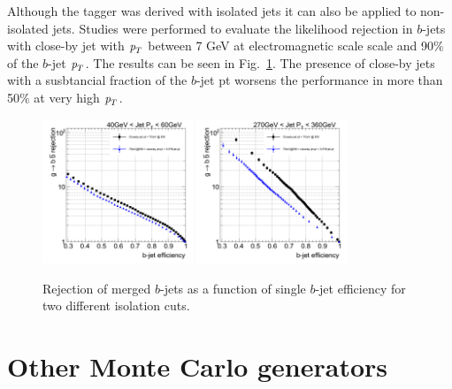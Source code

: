 Although the tagger was derived with isolated jets it can also be applied to non-isolated jets. Studies were performed to evaluate the likelihood rejection in $b$-jets with close-by jet with ${\emph{p}_{T}}$ between 7 GeV at electromagnetic scale scale and 90$\%$ of the $b$-jet ${\emph{p}_{T}}$. The results can be seen in  Fig.~\ref{fig:testisolation}. The presence of close-by jets with a susbtancial fraction of the $b$-jet pt worsens the performance in more than 50$\%$ at very high ${\emph{p}_{T}}$. 

\begin{figure}[tp]
\centering
\includegraphics[width=0.4\textwidth]{FIGS/systematics/DiffIsolationCutsKDE_RejvsEff40.png}
\includegraphics[width=0.4\textwidth]{FIGS/systematics/DiffIsolationCutsKDE_RejvsEff270.png}
\caption{Rejection of merged $b$-jets as a function of single $b$-jet efficiency for two different isolation cuts.}
\label{fig:testisolation}
\end{figure}


\section{Other Monte Carlo generators}\label{sec:otherMC}

